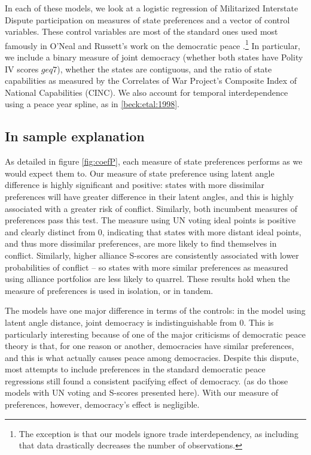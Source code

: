 In each of these models, we look at a logistic regression of Militarized Interstate Dispute participation on measures of state preferences and a vector of control variables. These control variables are most of the standard ones used most famously in O'Neal and Russett's work on the democratic peace \citep{oneal:russett:1997}.\footnote{The exception is that our models ignore trade interdependency, as including that data drastically decreases the number of observations.} In particular, we include a binary measure of joint democracy (whether both states have Polity IV scores $geq 7$), whether the states are contiguous, and the ratio of state capabilities as measured by the Correlates of War Project's Composite Index of National Capabilities (CINC). We also account for temporal interdependence using a peace year spline, as in \ref{beck:etal:1998}. 

\subsection{In sample explanation}

As detailed in figure \ref{fig:coefP}, each measure of state preferences performs as we would expect them to. Our measure of state preference using latent angle difference is highly significant and positive: states with more dissimilar preferences will have greater difference in their latent angles, and this is highly associated with a greater risk of conflict. Similarly, both incumbent measures of preferences pass this test. The measure using UN voting ideal points is positive and clearly distinct from $0$, indicating that states with more distant ideal points, and thus more dissimilar preferences, are more likely to find themselves in conflict. Similarly, higher alliance S-scores are consistently associated with lower probabilities of conflict -- so states with more similar preferences as measured using alliance portfolios are less likely to quarrel. These results hold when the measure of preferences is used in isolation, or in tandem.

The models have one major difference in terms of the controls: in the model using latent angle distance, joint democracy is indistinguishable from $0$. This is particularly interesting because of one of the major criticisms of democratic peace theory is that, for one reason or another, democracies have similar preferences, and this is what actually causes peace among democracies.  Despite this dispute, most attempts to include preferences in the standard democratic peace regressions still found a consistent pacifying effect of democracy.
(as do those models with UN voting and S-scores presented here). With our measure of preferences, however, democracy's effect is negligible.


